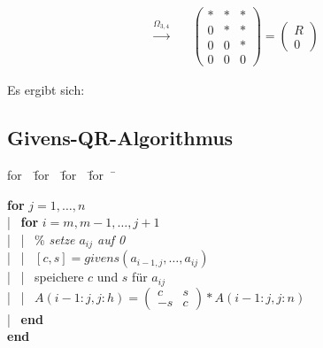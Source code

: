 \documentclass[ngerman,fontsize=11pt, paper=a4, parskip=half, titlepage=true, toc=bib]{scrbook}
\theoremstyle{definition}
\theoremstyle{plain}
\newcommand{\subsectione}[1]{\addtocounter{Def}{1}\subsection{#1}}
\newenvironment{pseudocode}[1]{ %
  \begin{minipage}{#1}
    \begin{framed}
      \hspace*{1em}	
      \begin{minipage}{#1}
        \begin{tabbing}
          for~~\= for~~\= for~~\= for~~\= \kill
	}
	{ %
        \end{tabbing}
      \end{minipage}
      \hspace*{1em}
    \end{framed}
  \end{minipage}
}
\begin{document}
\begin{align*}
  \quad \overset{\Omega_{3,4}}{\longrightarrow} \quad	
     & \left(\begin{array}{cccc}
               * & *  & *  \\
               0 & *  & * \\ 
               0 & 0 & * \\
               0 & 0 & 0
             \end{array}\right)
                       = \begin{pmatrix}
                         R \\ 0 
                       \end{pmatrix}
\end{align*}


Es ergibt sich:

\subsectione{Givens-QR-Algorithmus} 

\begin{pseudocode}{0.7\linewidth}
  \textbf{for} $j=1, \dotsc , n$ \\
  |~	\>	\textbf{for} $i=m, m-1, \dotsc , j+1$ \\
  |~	\>		|~	\>\% \textit{setze $a_{ij}$ auf 0} \\
  |~	\>		|~	\>$[c,s] = givens(a_{i-1,j}, \dotsc, a_{ij}) $\\
  |~	\>		|~	\>speichere $c$ und $s$ für $a_{ij}$ \\
  |~	\>		|~	\>$A(i-1:j, j:h) =\left( \begin{smallmatrix}c & s\\ -s & c	\end{smallmatrix}\right) * A(i-1:j, j:n)$ \\
  |~	\> \textbf{end}\\
  \textbf{end}							
\end{pseudocode}
\end{document}
